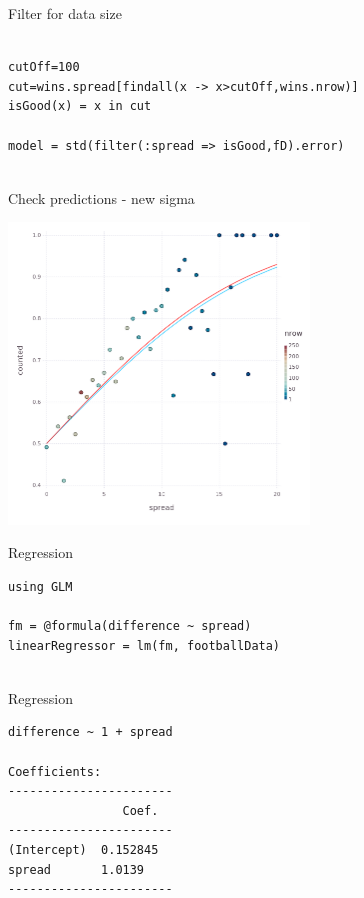 \documentclass{beamer}
\begin{document}
\begin{frame}[fragile]{Filter for data size}
  \begin{lstlisting}

cutOff=100
cut=wins.spread[findall(x -> x>cutOff,wins.nrow)]
isGood(x) = x in cut

model = std(filter(:spread => isGood,fD).error)
    
\end{lstlisting}
\end{frame}


\begin{frame}{Check predictions - new sigma}
  \begin{center}
    \includegraphics[width=8cm]{predictionGood.png}
\end{center}
  \end{frame}

\begin{frame}[fragile]{Regression}
  \begin{lstlisting}
using GLM
    
fm = @formula(difference ~ spread)
linearRegressor = lm(fm, footballData)
    
\end{lstlisting}
\end{frame}

\begin{frame}[fragile]{Regression}
  \begin{verbatim}
difference ~ 1 + spread

Coefficients:
-----------------------
                Coef.  
-----------------------
(Intercept)  0.152845  
spread       1.0139    
-----------------------
\end{verbatim}
 \end{frame}
\end{document}
